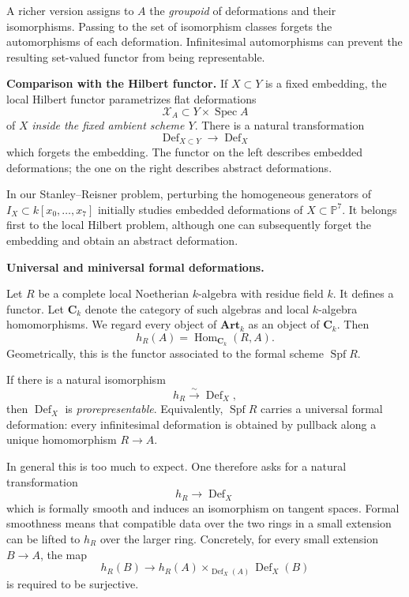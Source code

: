 \noindent
A richer version assigns to $A$ the
\emph{groupoid} of deformations and their
isomorphisms. Passing to the set of
isomorphism classes forgets the automorphisms
of each deformation. Infinitesimal
automorphisms can prevent the resulting
set-valued functor from being representable.

\medskip\noindent
\textbf{Comparison with the Hilbert
functor.}
If $X\subset Y$ is a fixed embedding, the
local Hilbert functor parametrizes flat
deformations
$$
\mathcal{X}_A\subset Y\times
\operatorname{Spec}A
$$
of $X$ \emph{inside the fixed ambient
scheme $Y$}. There is a natural
transformation
$$
\operatorname{Def}_{X\subset Y}
\longrightarrow
\operatorname{Def}_X
$$
which forgets the embedding. The functor on
the left describes embedded deformations;
the one on the right describes abstract
deformations.

In our Stanley--Reisner problem, perturbing
the homogeneous generators of
$I_X\subset k[x_0,\ldots,x_7]$ initially
studies embedded deformations of
$X\subset \mathbb{P}^7$. It belongs first
to the local Hilbert problem, although
one can subsequently forget the embedding
and obtain an abstract deformation.

\medskip
\noindent
\textbf{Universal and miniversal formal
deformations.}

\noindent
Let $R$ be a complete local Noetherian
$k$-algebra with residue field $k$. It
defines a functor. Let $\mathbf{C}_k$ denote
the category of such algebras and local
$k$-algebra homomorphisms. We regard every
object of $\mathbf{Art}_k$ as an object of
$\mathbf{C}_k$. Then
$$
h_R(A)=\operatorname{Hom}_{\mathbf{C}_k}
(R,A).
$$
Geometrically, this is the functor associated
to the formal scheme $\operatorname{Spf}R$.

If there is a natural isomorphism
$$
h_R\xrightarrow{\sim}
\operatorname{Def}_X,
$$
then $\operatorname{Def}_X$ is
\emph{prorepresentable}. Equivalently,
$\operatorname{Spf}R$ carries a universal
formal deformation: every infinitesimal
deformation is obtained by pullback along a
unique homomorphism $R\to A$.

In general this is too much to expect. One
therefore asks for a natural transformation
$$
h_R\longrightarrow\operatorname{Def}_X
$$
which is formally smooth and induces an
isomorphism on tangent spaces. Formal
smoothness means that compatible data over
the two rings in a small extension can be
lifted to $h_R$ over the larger ring.
Concretely, for every small extension
$B\longrightarrow A$, the map
$$
h_R(B)\longrightarrow
h_R(A)\times_{\operatorname{Def}_X(A)}
\operatorname{Def}_X(B)
$$
is required to be surjective.

